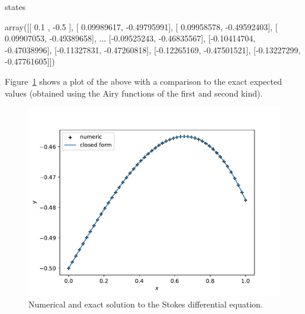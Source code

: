 \begin{pyin}
states
\end{pyin}





\begin{raw}
array([[ 0.1       , -0.5       ],
       [ 0.09989617, -0.49795991],
       [ 0.09958578, -0.49592403],
       [ 0.09907053, -0.49389658],
       ...
       [-0.09525243, -0.46835567],
       [-0.10414704, -0.47038996],
       [-0.11327831, -0.47260818],
       [-0.12265169, -0.47501521],
       [-0.13227299, -0.47761605]])
\end{raw}






Figure~\ref{fig:odeint_comparison_plot} shows a plot of the above with a comparison to the exact expected values (obtained
using the Airy functions of the first and second kind).


\begin{figure}[!htbp]
\begin{center}
\includegraphics[width=.7\textwidth]{./assets/odeint_comparison_plot/main.pdf}
    \caption{Numerical and exact solution to the Stokes differential equation.}
    \label{fig:odeint_comparison_plot}
\end{center}
\end{figure}
